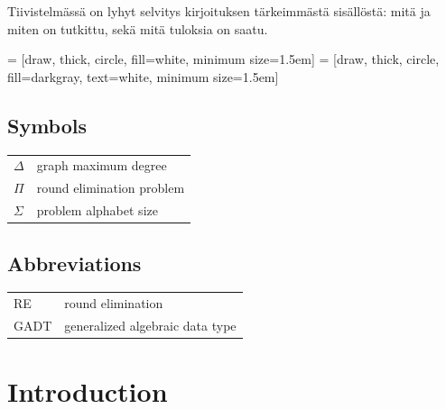 \documentclass[english, 12pt, a4paper, sci, a-1b, online]{aaltothesis}
\date{2022}
\begin{document}
\makecoverpage{}

\makecopyrightpage{}

\begin{abstractpage}[english]
  \abstracttext{}
\end{abstractpage}

\newpage


\begin{abstractpage}[finnish]
  Tiivistelmässä on lyhyt selvitys
  kirjoituksen tärkeimmästä sisällöstä: mitä ja miten on tutkittu,
  sekä mitä tuloksia on saatu. 
\end{abstractpage}

\thesistableofcontents{}



\newtheorem{theorem}{Theorem}[section]
\newtheorem{lemma}{Lemma}[section]
\newtheorem{corollary}{Corollary}[theorem]

\newcommand{\reline}[1]{\textbf{#1}}

 = [draw, thick, circle, fill=white, minimum size=1.5em]
 = [draw, thick, circle, fill=darkgray, text=white, minimum size=1.5em]

\subsection*{Symbols}

\begin{tabular}{ll}
  $\Delta$ & graph maximum degree \\
  $\Pi$    & round elimination problem \\
  $\Sigma$ & problem alphabet size
\end{tabular}

\subsection*{Abbreviations}

\begin{tabular}{ll}
  RE         & round elimination \\
  GADT       & generalized algebraic data type
\end{tabular}

\cleardoublepage{}
\section{Introduction}
\end{document}
